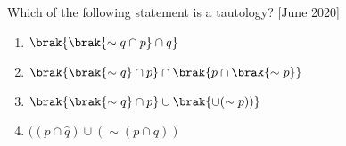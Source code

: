     \item Which of the following statement is a tautology?  \hfill{[June 2020]}
    \begin{multicols}{2}
    \begin{enumerate}
        \item $\brak{\brak{\sim q \cap p}\cap q} $
        \item $\brak{\brak{\sim q} \cap p} \cap \brak{p \cap \brak{\sim p}}$
        \item $\brak{\brak{\sim q} \cap p} \cup \brak{ \cup (\sim p))}$
        \item $((p\cap \hat q)\cup (\sim(p \cap q))$
    \end{enumerate}
    \end{multicols}
